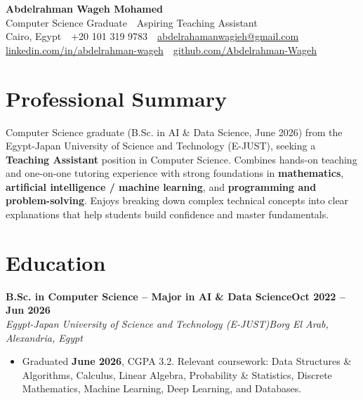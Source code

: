 \documentclass[11pt,a4paper]{article}
\newcommand{\role}[4]{%
  \noindent\textbf{#1}\hfill\textbf{#2}\\[0.3pt]%
  \textit{#3}\hfill\textit{#4}\par\vspace{1pt}%
}
\begin{document}
\begin{center}
  {\LARGE\bfseries Abdelrahman Wageh Mohamed}\\[3pt]
  {\normalsize Computer Science Graduate \,\textbar\, Aspiring Teaching Assistant}\\[4pt]
  \small
  Cairo, Egypt \,\textbar\, +20 101 319 9783 \,\textbar\,
  \href{mailto:abdelrahamanwagieh@gmail.com}{abdelrahamanwagieh@gmail.com}\\[1pt]
  \href{https://www.linkedin.com/in/abdelrahman-wageh-036503365/}{linkedin.com/in/abdelrahman-wageh}
  \,\textbar\,
  \href{https://github.com/Abdelrahman-Wageh}{github.com/Abdelrahman-Wageh}
\end{center}

\section{Professional Summary}
Computer Science graduate (B.Sc. in AI \& Data Science, June 2026) from the
Egypt-Japan University of Science and Technology (E-JUST), seeking a
\textbf{Teaching Assistant} position in Computer Science. Combines hands-on
teaching and one-on-one tutoring experience with strong foundations in
\textbf{mathematics}, \textbf{artificial intelligence / machine learning},
and \textbf{programming and problem-solving}. Enjoys breaking down complex
technical concepts into clear explanations that help students build confidence
and master fundamentals.

\section{Education}
\role{B.Sc. in Computer Science -- Major in AI \& Data Science}{Oct 2022 -- Jun 2026}{Egypt-Japan University of Science and Technology (E-JUST)}{Borg El Arab, Alexandria, Egypt}
\begin{itemize}
  \item Graduated \textbf{June 2026}, CGPA 3.2. Relevant coursework: Data Structures \& Algorithms,
        Calculus, Linear Algebra, Probability \& Statistics, Discrete Mathematics, Machine
        Learning, Deep Learning, and Databases.
\end{itemize}
\end{document}
